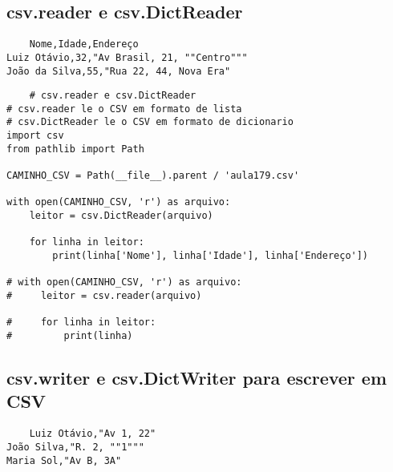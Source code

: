 \documentclass{article}
\begin{document}
\subsection{csv.reader e csv.DictReader}
\begin{lstlisting}
    Nome,Idade,Endereço
Luiz Otávio,32,"Av Brasil, 21, ""Centro"""
João da Silva,55,"Rua 22, 44, Nova Era"
\end{lstlisting}

\begin{lstlisting}
    # csv.reader e csv.DictReader
# csv.reader le o CSV em formato de lista
# csv.DictReader le o CSV em formato de dicionario
import csv
from pathlib import Path

CAMINHO_CSV = Path(__file__).parent / 'aula179.csv'

with open(CAMINHO_CSV, 'r') as arquivo:
    leitor = csv.DictReader(arquivo)

    for linha in leitor:
        print(linha['Nome'], linha['Idade'], linha['Endereço'])

# with open(CAMINHO_CSV, 'r') as arquivo:
#     leitor = csv.reader(arquivo)

#     for linha in leitor:
#         print(linha)
\end{lstlisting}



\subsection{csv.writer e csv.DictWriter para escrever em CSV}
\begin{lstlisting}
    Luiz Otávio,"Av 1, 22"
João Silva,"R. 2, ""1"""
Maria Sol,"Av B, 3A"
\end{lstlisting}
\end{document}
